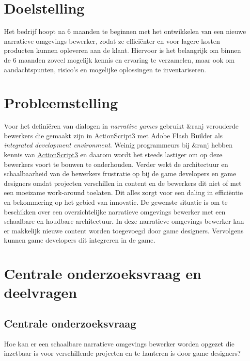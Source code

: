\documentclass{report}
\newcommand{\organisation}{\&ranj }
\begin{document}
\section{Doelstelling}
Het bedrijf hoopt na 6 maanden te beginnen met het ontwikkelen van een nieuwe narratieve omgevings bewerker, zodat ze effici{\"e}nter en voor lagere kosten producten kunnen opleveren aan de klant. Hiervoor is het belangrijk om binnen de 6 maanden zoveel mogelijk kennis en ervaring te verzamelen, maar ook om aandachtspunten, risico's en mogelijke oplossingen te inventariseren.

\section{Probleemstelling}
Voor het defini{\"e}ren van dialogen in \emph{narrative games} gebruikt \organisation verouderde bewerkers die gemaakt zijn in \href{http://www.adobe.com/devnet/actionscript/articles/actionscript3_overview.html}{ActionScript3} met \href{https://en.wikipedia.org/wiki/Adobe_Flash_Builder}{Adobe Flash Builder} als \emph{integrated development environment}. Weinig programmeurs bij \organisation hebben kennis van \href{http://www.adobe.com/devnet/actionscript/articles/actionscript3_overview.html}{ActionScript3} en daarom wordt het steeds lastiger om op deze bewerkers voort te bouwen te onderhouden. Verder wekt de architectuur en schaalbaarheid van de bewerkers frustratie op bij de game developers en game designers omdat projecten verschillen in content en de bewerkers dit niet of met een moeizame work-around toelaten. Dit alles zorgt voor een daling in effici{\"e}ntie en bekommering op het gebied van innovatie.
De gewenste situatie is om te beschikken over een overzichtelijke narratieve omgevings bewerker met een schaalbare en houdbare architectuur. In deze narratieve omgevings bewerker kan er makkelijk nieuwe content worden toegevoegd door game designers. Vervolgens kunnen game developers dit integreren in de game.

\section{Centrale onderzoeksvraag en deelvragen}
\subsection{Centrale onderzoeksvraag}
Hoe kan er een schaalbare narratieve omgevings bewerker worden opgezet die inzetbaar is voor verschillende projecten en te hanteren is door game designers?
\end{document}

